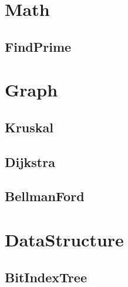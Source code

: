\section{Math}
    \subsection{FindPrime}
        
\section{Graph}
    \subsection{Kruskal}
        
    \subsection{Dijkstra}
        
    \subsection{BellmanFord}
        
\section{DataStructure}
    \subsection{BitIndexTree}
        
    
